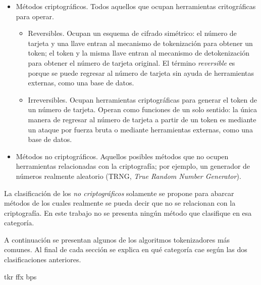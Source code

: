 \begin{itemize}
  \item Métodos criptográficos. Todos aquellos que ocupan herramientas
    critográficas para operar.
    \begin{itemize}
      \item Reversibles. Ocupan un esquema de cifrado simétrico: el número
        de tarjeta y una llave entran al mecanismo de tokenización para obtener
        un token; el token y la misma llave entran al mecanismo de
        detokenización para obtener el número de tarjeta original. El término
        \textit{reversible} es porque se puede regresar al número de tarjeta sin
        ayuda de herramientas externas, como una base de datos.
      \item Irreversibles. Ocupan herramientas criptográficas para generar el
        token de un número de tarjeta. Operan como funciones de un solo sentido:
        la única manera de regresar al número de tarjeta a partir de un token es
        mediante un ataque por fuerza bruta o mediante herramientas externas,
        como una base de datos.
    \end{itemize}
  \item Métodos no criptográficos. Aquellos posibles métodos que no ocupen
    herramientas relacionadas con la criptografía; por ejemplo, un generador de
    números realmente aleatorio (TRNG, \textit{True Random Number Generator}).
\end{itemize}

La clasificación de los \textit{no criptográficos} solamente se propone para
abarcar métodos de los cuales realmente se pueda decir que no se relacionan con
la criptografía. En este trabajo no se presenta ningún método que clasifique en
esa categoría.

A continuación se presentan algunos de los algoritmos tokenizadores más comunes.
Al final de cada sección se explica en qué categoría cae según las dos
clasificaciones anteriores.

{tkr}
{ffx}
{bps}
